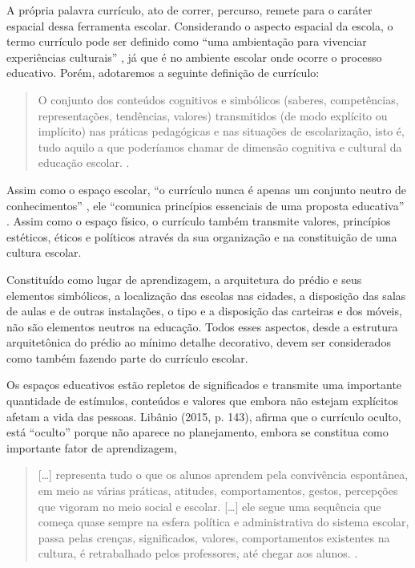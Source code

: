 \begin{refsection}
    A própria palavra currículo, ato de correr, percurso, remete para o caráter espacial dessa ferramenta escolar. Considerando o aspecto espacial da escola, o termo currículo pode ser definido como “uma ambientação para vivenciar experiências culturais” \cite[p.~129]{LIBÂNEO2015Organização}, já que é no ambiente escolar onde ocorre o processo educativo. Porém, adotaremos a seguinte definição de currículo: 

    \begin{quotation}
        O conjunto dos conteúdos cognitivos e simbólicos (saberes, competências, representações, tendências, valores) transmitidos (de modo explícito ou implícito) nas práticas pedagógicas e nas situações de escolarização, isto é, tudo aquilo a que poderíamos chamar de dimensão cognitiva e cultural da educação escolar. \cite[FORQUIM, 2000, p.~48, apud][p.~129]{LIBÂNEO2015Organização}. 
    \end{quotation}

    Assim como o espaço escolar, “o currículo nunca é apenas um conjunto neutro de conhecimentos” \cite[p.~59]{APPLE1992The}, ele “comunica princípios essenciais de uma proposta educativa” \cite[PEDRA, 1997, apud][p.~129]{LIBÂNEO2015Organização}. Assim como o espaço físico, o currículo também transmite valores, princípios estéticos, éticos e políticos através da sua organização e na constituição de uma cultura escolar. 

    Constituído como lugar de aprendizagem, a arquitetura do prédio e seus elementos simbólicos, a localização das escolas nas cidades, a disposição das salas de aulas e de outras instalações, o tipo e a disposição das carteiras e dos móveis, não são elementos neutros na educação. Todos esses aspectos, desde a estrutura arquitetônica do prédio ao mínimo detalhe decorativo, devem ser considerados como também fazendo parte do currículo escolar. 

    Os espaços educativos estão repletos de significados e transmite uma importante quantidade de estímulos, conteúdos e valores que embora não estejam explícitos afetam a vida das pessoas. Libânio (2015, p. 143), afirma que o currículo oculto, está “oculto” porque não aparece no planejamento, embora se constitua como importante fator de aprendizagem,

    \begin{quotation}
        [\dots] representa tudo o que os alunos aprendem pela convivência espontânea, em meio as várias práticas, atitudes, comportamentos, gestos, percepções que vigoram no meio social e escolar. [\dots] ele segue uma sequência que começa quase sempre na esfera política e administrativa do sistema escolar, passa pelas crenças, significados, valores, comportamentos existentes na cultura, é retrabalhado pelos professores, até chegar aos alunos. \cite[p.~143]{LIBÂNEO2015Organização}. 
    \end{quotation}


\end{refsection}
